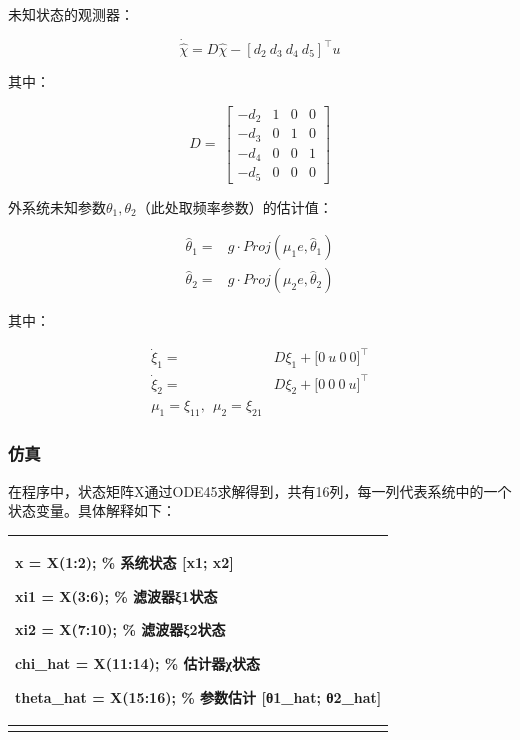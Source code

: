 \documentclass[
  12pt,
  a4paper
]{article}
\begin{document}
未知状态的观测器：

\[\dot{\widehat{\chi}} = D\widehat{\chi} - \left\lbrack d_{2}\ d_{3}\ d_{4}\ d_{5} \right\rbrack^{\top}u\]

其中：

\[D = \ \begin{bmatrix}
 - d_{2} & 1 & 0 & 0 \\
 - d_{3} & 0 & 1 & 0 \\
 - d_{4} & 0 & 0 & 1 \\
 - d_{5} & 0 & 0 & 0
\end{bmatrix}\]

外系统未知参数\(\theta_{1},\theta_{2}\)（此处取频率参数）的估计值：

\[\begin{aligned}
{\widehat{\theta}}_{1} = & g \cdot Proj\left( \mu_{1}e,{\widehat{\theta}}_{1} \right) \\
{\widehat{\theta}}_{2} = & g \cdot Proj\left( \mu_{2}e,{\widehat{\theta}}_{2} \right)
\end{aligned}\]

其中：

\[\begin{aligned}
{\dot{\xi}}_{1} = & D\xi_{1} + \lbrack 0\ u\ 0\ 0\rbrack^{\top} \\
{\dot{\xi}}_{2} = & D\xi_{2} + \lbrack 0\ 0\ 0\ u\rbrack^{\top} \\
\mu_{1} = \xi_{11},\ \ \mu_{2} = \xi_{21}
\end{aligned}\]

\subsubsection{仿真}\label{ux4effux771f}

在程序中，状态矩阵X通过ODE45求解得到，共有16列，每一列代表系统中的一个状态变量。具体解释如下：

\begin{longtable}[]{@{}
  >{\raggedright\arraybackslash}p{}@{}}
\toprule\noalign{}
\begin{minipage}[b]{\linewidth}\raggedright
x = X(1:2); \% 系统状态 {[}x1; x2{]}

xi1 = X(3:6); \% 滤波器ξ1状态

xi2 = X(7:10); \% 滤波器ξ2状态

chi\_hat = X(11:14); \% 估计器χ状态

theta\_hat = X(15:16); \% 参数估计 {[}θ1\_hat; θ2\_hat{]}
\end{minipage} \\
\midrule\noalign{}
\endhead
\bottomrule\noalign{}
\endlastfoot
\end{longtable}
\end{document}
